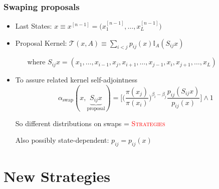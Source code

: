 \documentclass[xetex]{beamer}
\begin{document}

	\begin{frame}[t]\frametitle{Swaping proposals}
	    
		\begin{itemize}
			\item 	Last States:   	$x \equiv x^{[n-1]} 	= \Big( x^{[n-1]}_1, \dots, x^{[n-1]}_L \Big)$
			\item  	Proposal Kernel:   	$\mathcal{T}(x, A) \equiv \underset{i < j}{\sum} p_{ij}(x) \mathbb{I}_A (S_{ij} x)$
			\begin{itemize}
				\item[where] 	$S_{ij} x = (x_1, \dots, x_{i-1}, x_j, x_{i+1}, \dots, x_{j-1}, x_i, x_{j+1}, \dots, x_L)$	 
			\end{itemize}		
			
			\item To assure related kernel self-adjointness
			\begin{equation*}
				\alpha_\text{swap}(x,\underbrace{S_{ij} x}_\text{proposal}) = \Biggl[  \Big(\frac{\pi(x_j)}{\pi(x_i)} \Big)^{\beta_i - \beta_j}  \frac{ p_{ij}(S_{ij} x )}{ p_{ij}( x ) }\Biggl] \wedge 1
			\end{equation*}

			\item[So] different distributions on swaps = \textcolor{red}{\textsc{Strategies}}
			\item[Also] possibly state-dependent: $p_{ij} = p_{ij}(x)$
		\end{itemize}
	
	\end{frame}

\section{New Strategies}
\end{document}
